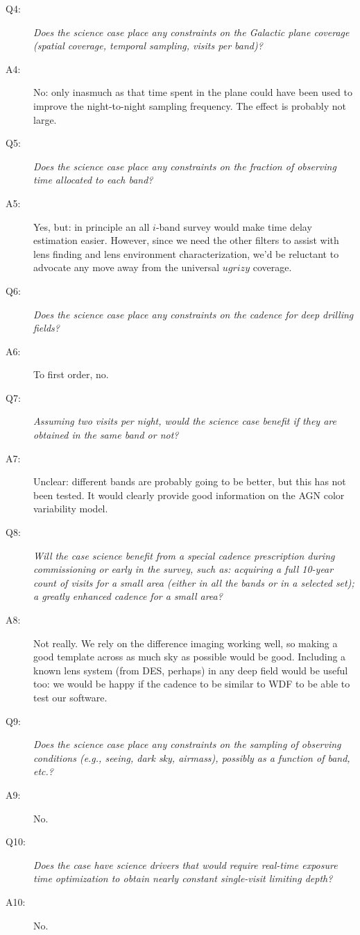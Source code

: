 \begin{description}
\item[Q4:] {\it Does the science case place any constraints on the
Galactic plane coverage (spatial coverage, temporal sampling, visits per
band)?}

\item[A4:] No: only inasmuch as that time spent in the plane could have
been used to improve the night-to-night sampling frequency. The effect
is probably not large.

\item[Q5:] {\it Does the science case place any constraints on the
fraction of observing time allocated to each band?}

\item[A5:] Yes, but: in principle an all $i$-band survey would make time
delay estimation easier. However, since we need the other filters to
assist with lens finding and lens environment characterization, we'd be
reluctant to advocate any move away from the universal $ugrizy$
coverage.

\item[Q6:] {\it Does the science case place any constraints on the
cadence for deep drilling fields?}

\item[A6:] To first order, no.

\item[Q7:] {\it Assuming two visits per night, would the science case
benefit if they are obtained in the same band or not?}

\item[A7:] Unclear: different bands are probably going to be
better, but this has not been tested. It would clearly provide good
information on the AGN color variability model.

\item[Q8:] {\it Will the case science benefit from a special cadence
prescription during commissioning or early in the survey, such as:
acquiring a full 10-year count of visits for a small area (either in all
the bands or in a  selected set); a greatly enhanced cadence for a small
area?}

\item[A8:] Not really. We rely on the difference imaging working well,
so making a good template across as much sky as possible would be good.
Including a known lens system (from DES, perhaps) in any deep field
would be useful too: we would be happy if the cadence to be similar to
WDF to be able to test our software.

\item[Q9:] {\it Does the science case place any constraints on the
sampling of observing conditions (e.g., seeing, dark sky, airmass),
possibly as a function of band, etc.?}

\item[A9:] No.

\item[Q10:] {\it Does the case have science drivers that would require
real-time exposure time optimization to obtain nearly constant
single-visit limiting depth?}

\item[A10:] No.

\end{description}

\navigationbar

